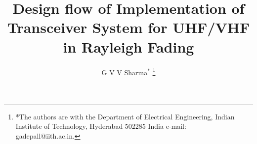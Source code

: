 \documentclass[journal,12pt,onecolumn]{IEEEtran}
\begin{document}
\let\StandardTheFigure\thefigure
\renewcommand{\thefigure}{\theproblem}



\makeatletter
{}
\makeatother

\let\StandardTheFigure\thefigure
\let\StandardTheTable\thetable
\let\vec\mathbf





\def\putbox#1#2#3{\makebox[0in][l]{\makebox[#1][l]{}\raisebox{\baselineskip}[0in][0in]{\raisebox{#2}[0in][0in]{#3}}}}
     \def\rightbox#1{\makebox[0in][r]{#1}}
     \def\centbox#1{\makebox[0in]{#1}}
     \def\topbox#1{\raisebox{-\baselineskip}[0in][0in]{#1}}
     \def\midbox#1{\raisebox{-0.5\baselineskip}[0in][0in]{#1}}



\title{ 
Design flow of  Implementation of Transceiver System for UHF/VHF in Rayleigh Fading
}



\author{G V V Sharma$^{*}$%
\thanks{*The authors are with the Department
of Electrical Engineering, Indian Institute of Technology, Hyderabad
502285 India e-mail:  gadepall@iith.ac.in.}
}


\maketitle

\tableofcontents

%

\end{document}
